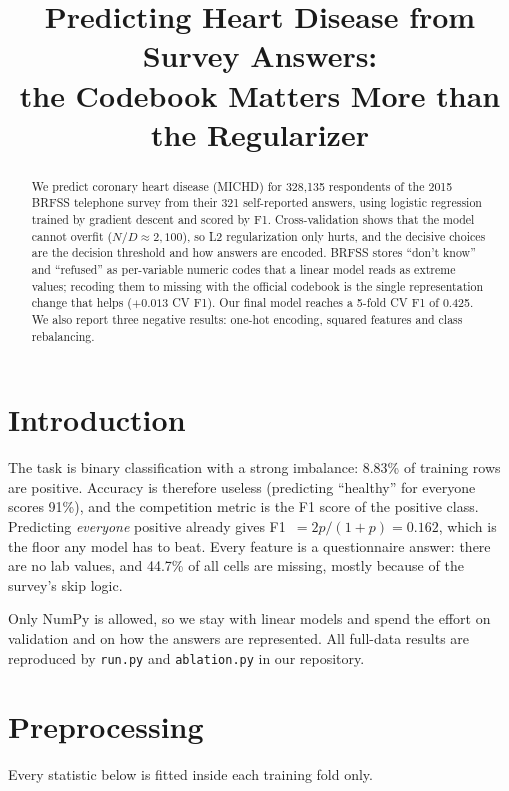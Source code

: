 \documentclass[10pt,conference]{IEEEtran}
\begin{document}
\title{Predicting Heart Disease from Survey Answers:\\
the Codebook Matters More than the Regularizer}

\author{
}

\maketitle

\begin{abstract}
We predict coronary heart disease (MICHD) for 328,135 respondents of the 2015
BRFSS telephone survey from their 321 self-reported answers, using logistic
regression trained by gradient descent and scored by F1. Cross-validation shows
that the model cannot overfit ($N/D \approx 2{,}100$), so L2 regularization only
hurts, and the decisive choices are the decision threshold and how answers are
encoded. BRFSS stores ``don't know'' and ``refused'' as per-variable numeric
codes that a linear model reads as extreme values; recoding them to missing with
the official codebook is the single representation change that helps
($+0.013$ CV F1). Our final model reaches a 5-fold CV F1 of 0.425.
We also report three negative results: one-hot encoding, squared features and
class rebalancing.
\end{abstract}

\section{Introduction}
The task is binary classification with a strong imbalance: 8.83\% of training
rows are positive. Accuracy is therefore useless (predicting ``healthy'' for
everyone scores 91\%), and the competition metric is the F1 score of the
positive class. Predicting \emph{everyone} positive already gives
F1~$=2p/(1+p)=0.162$, which is the floor any model has to beat. Every feature is
a questionnaire answer: there are no lab values, and 44.7\% of all cells are
missing, mostly because of the survey's skip logic.

Only NumPy is allowed, so we stay with linear models and spend the effort on
validation and on how the answers are represented. All full-data results are
reproduced by \texttt{run.py} and \texttt{ablation.py} in our repository.

\section{Preprocessing}
\label{sec:prep}
Every statistic below is fitted inside each training fold only.
\end{document}
